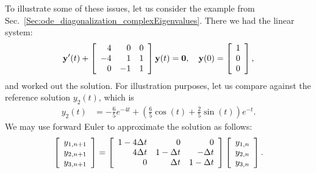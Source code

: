 To illustrate some of these issues, let us consider the example from Sec.~\ref{Sec:ode_diagonalization_complexEigenvalues}. There we had the linear system:
\begin{align}
  \mathbf{y}'(t) + \left[ \begin{array}{r r r}
   4 &  0 &  0 \\
  -4 &  1 &  1 \\
   0 & -1 &  1 \\ \end{array} \right] \mathbf{y}(t) = \mathbf{0}, \quad 
   \mathbf{y}(0) = \left[ \begin{array}{c} 1 \\ 0 \\ 0 \\ \end{array} \right] , \nonumber
\end{align}
and worked out the solution. For illustration purposes, let us compare against the reference solution $y_2(t)$, which is
\begin{align}
  y_2(t) &= -\frac{6}{5} e^{-4t} + \left( \frac{6}{5} \cos(t) + \frac{2}{5} \sin(t) \right) e^{-t}. \nonumber
\end{align}
We may use forward Euler to approximate the solution as follows:
\begin{align}
  \left[ \begin{array}{c} y_{1,n+1} \\ y_{2,n+1} \\ y_{3,n+1} \end{array} \right] =
  \left[ \begin{array}{r r r}
   1 - 4\Delta t &             0 &             0 \\
       4\Delta t &  1 - \Delta t &     -\Delta t \\
               0 &      \Delta t &  1 - \Delta t \\ \end{array} \right]  
  \left[ \begin{array}{c} y_{1,n} \\ y_{2,n} \\ y_{3,n} \end{array} \right] .
\end{align}

